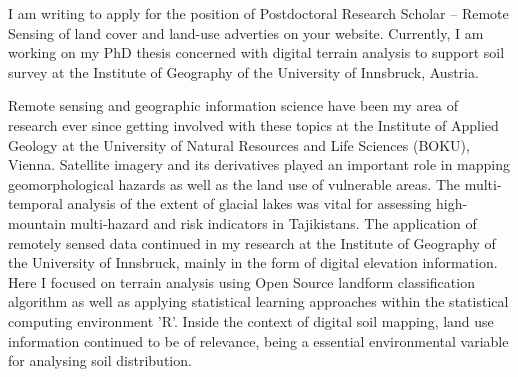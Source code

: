 \documentclass[11pt,a4paper,sans]{moderncv}        %
\begin{document}
I am writing to apply for the position of Postdoctoral Research Scholar -- Remote Sensing of land cover and land-use adverties on your website. Currently, I am working on my PhD thesis concerned with digital terrain analysis to support soil survey at the Institute of Geography of the University of Innsbruck, Austria.

Remote sensing and geographic information science have been my area of research ever since getting involved with these topics at the Institute of Applied Geology at the University of Natural Resources and Life Sciences (BOKU), Vienna. Satellite imagery and its derivatives played an important role in mapping geomorphological hazards as well as the land use of vulnerable areas. The multi-temporal analysis of the extent of glacial lakes was vital for assessing high-mountain multi-hazard and risk indicators in Tajikistans. The application of remotely sensed data continued in my research at the Institute of Geography of the University of Innsbruck, mainly in the form of digital elevation information. Here I focused on terrain analysis using Open Source landform classification algorithm as well as applying statistical learning approaches within the statistical computing environment 'R'. Inside the context of digital soil mapping, land use information continued to be of relevance, being a essential environmental variable for analysing soil distribution.  

\makeletterclosing

\end{document}
